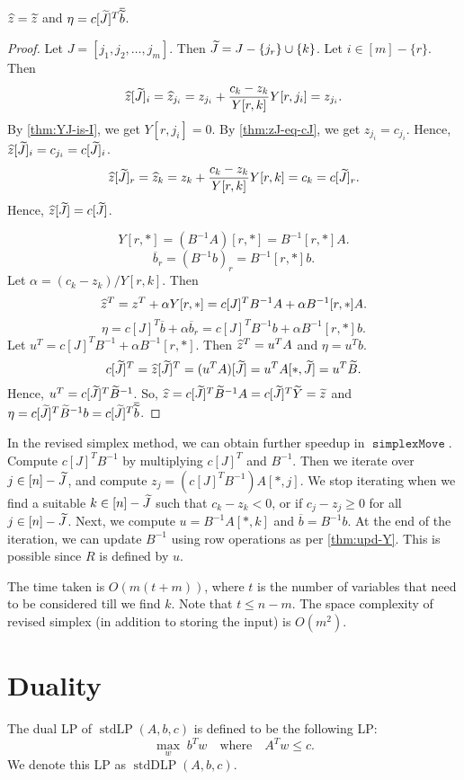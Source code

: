 \documentclass[a4paper, 12pt, fleqn]{article}
\newcommand*{\bline}{\overline{b}}
\newcommand*{\btildline}{\overline{\btild}}
\DeclareMathOperator{\stdLP}{stdLP}
\DeclareMathOperator{\stdDLP}{stdDLP}
\DeclareMathOperator{\simplexMove}{\mathtt{simplexMove}}
\newenvironment*{longProof}{\begin{proof}}{\end{proof}}
\begin{document}
\begin{lemma}
\label{thm:upd-z}
$\widehat{z} = \widetilde{z}$ and $\eta = c[\Jtild]^T\btildline$.
\end{lemma}
\begin{longProof}
Let $J = [j_1, j_2, \ldots, j_m]$. Then $\widetilde{J} = J - \{j_r\} \cup \{k\}$.
Let $i \in [m] - \{r\}$. Then
\[ \widehat{z}[\widetilde{J}]_i = \widehat{z}_{j_i} = z_{j_i} + \frac{c_k - z_k}{Y[r,k]} Y[r,j_i] = z_{j_i}. \]
By \cref{thm:YJ-is-I}, we get $Y[r,j_i] = 0$.
By \cref{thm:zJ-eq-cJ}, we get $z_{j_i} = c_{j_i}$.
Hence, $\widehat{z}[\widetilde{J}]_i = c_{j_i} = c[\widetilde{J}]_i$.
\[ \widehat{z}[\widetilde{J}]_r = \widehat{z}_k = z_k + \frac{c_k - z_k}{Y[r,k]} Y[r,k] = c_k = c[\widetilde{J}]_r. \]
Hence, $\widehat{z}[\widetilde{J}] = c[\widetilde{J}]$.

\[ Y[r,*] = (B^{-1}A)[r,*] = B^{-1}[r,*]A. \]
\[ \bline_r = (B^{-1}b)_r = B^{-1}[r,*]b. \]
Let $\alpha = (c_k - z_k)/Y[r,k]$. Then
\[ \widehat{z}^T = z^T + \alpha Y[r,*] = c[J]^TB^{-1}A + \alpha B^{-1}[r,*]A. \]
\[ \eta = c[J]^T\bline + \alpha \bline_r = c[J]^TB^{-1}b + \alpha B^{-1}[r,*]b. \]
Let $u^T = c[J]^TB^{-1} + \alpha B^{-1}[r,*]$. Then $\widehat{z}^T = u^TA$ and $\eta = u^Tb$.
\[ c[\widetilde{J}]^T = \widehat{z}[\widetilde{J}]^T = (u^TA)[\widetilde{J}] = u^TA[*,\widetilde{J}] = u^T\widetilde{B}. \]
Hence, $u^T = c[\widetilde{J}]^T\widetilde{B}^{-1}$.
So, $\widehat{z} = c[\widetilde{J}]^T\widetilde{B}^{-1}A = c[\widetilde{J}]^T\widetilde{Y} = \widetilde{z}$
and $\eta = c[\Jtild]^T\Btild^{-1}b = c[\Jtild]^T\btildline$.
\end{longProof}

In the revised simplex method, we can obtain further speedup in $\simplexMove$.
Compute $c[J]^TB^{-1}$ by multiplying $c[J]^T$ and $B^{-1}$.
Then we iterate over $j \in [n] - \widetilde{J}$, and compute $z_j = (c[J]^TB^{-1})A[*,j]$.
We stop iterating when we find a suitable $k \in [n] - \widetilde{J}$ such that $c_k - z_k < 0$,
or if $c_j - z_j \ge 0$ for all $j \in [n] - \widetilde{J}$.
Next, we compute $u = B^{-1}A[*,k]$ and $\bline = B^{-1}b$.
At the end of the iteration, we can update $B^{-1}$ using row operations as per \cref{thm:upd-Y}.
This is possible since $R$ is defined by $u$.

The time taken is $O(m(t+m))$, where $t$ is the number of variables
that need to be considered till we find $k$. Note that $t \le n-m$.
The space complexity of revised simplex (in addition to storing the input) is $O(m^2)$.

\section{Duality}

\begin{definition}[Dual LP]
The dual LP of $\stdLP(A, b, c)$ is defined to be the following LP:
\[ \max_w\; b^Tw \quad\textrm{where}\quad A^Tw \le c. \]
We denote this LP as $\stdDLP(A, b, c)$.
\end{definition}
\end{document}
